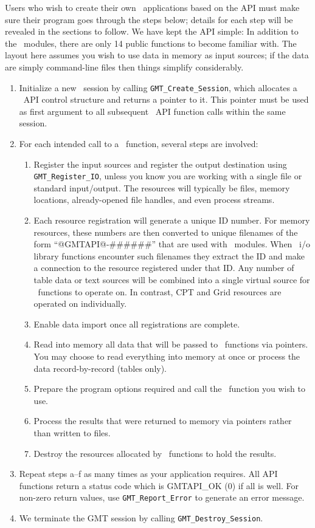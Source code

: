 \documentclass{report}
\begin{document}
Users who wish to create their own \GMT\ applications based on the API
must make sure their program goes through the steps below; details
for each step will be revealed in the sections to follow.  We have kept the
API simple: In addition to the \GMT\ modules, there are only 14 public functions to become familiar with.
The layout here assumes you wish to use data in memory as input sources; if the data are simply
command-line files then things simplify considerably.

\begin{enumerate}
\item Initialize a new \GMT\ session by calling \texttt{GMT\_Create\_Session}, which
allocates a \GMT\ API control structure and returns a pointer to it.  This pointer must be used
as first argument to all subsequent \GMT\ API function calls within the same session.
\item For each intended call to a \GMT\ function, several steps are involved:
\begin{enumerate}
\item Register the input sources and register the output destination
using \texttt{GMT\_Register\_IO}, unless you know you are working with a single file
or standard input/output.
The resources will typically be files, memory locations, already-opened file handles,
and even process streams.
\item Each resource registration will generate a unique ID number.  For memory resources, these numbers are
then converted to unique filenames of the form ``@GMTAPI@-\#\#\#\#\#\#'' that are used with \GMT\ modules.  When
\GMT\ i/o library functions encounter such filenames they extract the ID and make a connection
to the resource registered under that ID.  Any number of table data or text sources
will be combined into a single virtual source for \GMT\ functions to operate on.
In contrast, CPT and Grid resources are operated on individually.
\item Enable data import once all registrations are complete.
\item Read into memory all data that will be passed to \GMT\ functions via pointers.  You may choose
	to read everything into memory at once or process the data record-by-record (tables only).
\item Prepare the program options required and call the \GMT\ function you wish to use.
\item Process the results that were returned to memory via pointers rather than written to files.
\item Destroy the resources allocated by \GMT\ functions to hold the results.
\end{enumerate}
\item Repeat steps a--f as many times as your application requires.  All API functions
return a status code which is GMTAPI\_OK (0) if all is well.  For non-zero return values, use
\texttt{GMT\_Report\_Error} to generate an error message.
\item We terminate the GMT session by calling \texttt{GMT\_Destroy\_Session}.
\end{enumerate}
\end{document}
